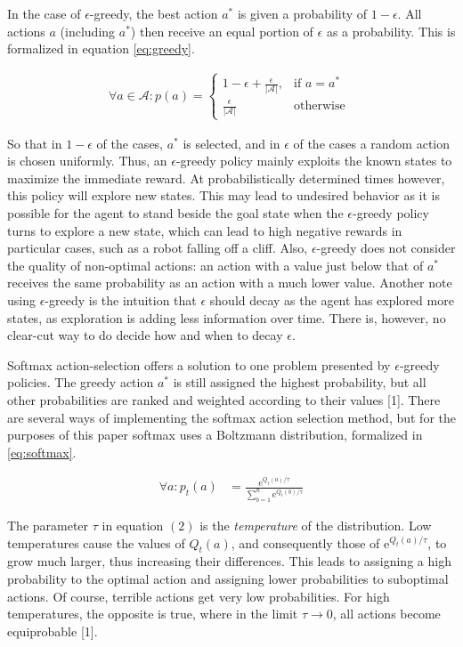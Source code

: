 \documentclass{article}
\begin{document}
In the case of $\epsilon$-greedy, the best action $a^*$ is given a probability of $1-\epsilon$. All actions $a$ (including $a^*$) then receive an equal portion of $\epsilon$ as a probability. This is formalized in equation \ref{eq:greedy}.
\begin{mdframed}
\begin{align}
\forall a \in \mathcal{A}:p(a) = 
\begin{cases}\label{eq:greedy}
	1 - \epsilon + \frac{\epsilon}{|\mathcal{A}|}, & \text{if } a = a^*\\
	\frac{\epsilon}{|\mathcal{A}|} & \text{otherwise }
\end{cases}
\end{align}
\end{mdframed}
So that in $1-\epsilon$ of the cases, $a^*$ is selected, and in $\epsilon$ of the cases a random action is chosen uniformly. Thus, an $\epsilon$-greedy policy mainly exploits the known states to maximize the immediate reward. At probabilistically determined times however, this policy will explore new states. This may lead to undesired behavior as it is possible for the agent to stand beside the goal state when the $\epsilon$-greedy policy turns to explore a new state, which can lead to high negative rewards in particular cases, such as a robot falling off a cliff. Also, $\epsilon$-greedy does not consider the quality of non-optimal actions: an action with a value just below that of $a^*$ receives the same probability as an action with a much lower value. Another note using $\epsilon$-greedy is the intuition that $\epsilon$ should decay as the agent has explored more states, as exploration is adding less information over time. There is, however, no clear-cut way to do decide how and when to decay $\epsilon$.

Softmax action-selection offers a solution to one problem presented by $\epsilon$-greedy policies. The greedy action $a^*$ is still assigned the highest probability, but all other probabilities are ranked and weighted according to their values [1]. There are several ways of implementing the softmax action selection method, but for the purposes of this paper softmax uses a Boltzmann distribution, formalized in \ref{eq:softmax}.
\begin{mdframed}
\begin{align}
\forall a: p_t(a) &= \frac{\text{e}^{Q_t(a)/\tau}}{\sum^n_{b=1}\text{e}^{Q_t(b)/\tau}} \label{eq:softmax}
\end{align}
\end{mdframed}
The parameter $\tau$ in equation $(2)$ is the \textit{temperature} of the distribution. Low temperatures cause the values of $Q_t(a)$, and consequently those of e$^{Q_t(a)/\tau}$, to grow much larger, thus increasing their differences. This leads to assigning a high probability to the optimal action and assigning lower probabilities to suboptimal actions. Of course, terrible actions get very low probabilities. For high temperatures, the opposite is true, where in the limit $\tau\rightarrow0$, all actions become equiprobable [1].
\end{document}

